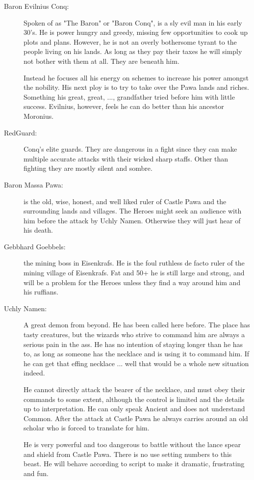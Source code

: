 \begin{description}
\item[Baron Evilnius Conq:] Spoken of as "The Baron" or "Baron Conq", is a sly evil man in his early 30's. He is power hungry and greedy, missing few opportunities to cook up plots and plans. However, he is not an overly bothersome tyrant to the people living on his lands. As long as they pay their taxes he will simply not bother with them at all. They are beneath him.

Instead he focuses all his energy on schemes to increase his power amongst the nobility. His next ploy is to try to take over the Pawa lands and riches. Something his great, great, ..., grandfather tried before him with little success. Evilnius, however, feels he can do better than his ancestor Moronius.


\item[RedGuard:] Conq's elite guards. They are dangerous in a fight since they can make multiple accurate attacks with their wicked sharp staffs. Other than fighting they are mostly silent and sombre.


\item[Baron Massa Pawa:] is the old, wise, honest, and well liked ruler of Castle Pawa and the surrounding lands and villages. The Heroes might seek an audience with him before the attack by Uchly Namen. Otherwise they will just hear of his death.


\item[Gebbhard Goebbels:] the mining boss in Eisenkrafs. He is the foul ruthless de facto ruler of the mining village of Eisenkrafs. Fat and 50+ he is still large and strong, and will be a problem for the Heroes unless they find a way around him and his ruffians.


\item[Uchly Namen:] A great demon from beyond. He has been called here before. The place has tasty creatures, but the wizards who strive to command him are always a serious pain in the ass. He has no intention of staying longer than he has to, as long as someone has the necklace and is using it to command him. If he can get that effing necklace ... well that would be a whole new situation indeed.

He cannot directly attack the bearer of the necklace, and must obey their commands to some extent, although the control is limited and the details up to interpretation. He can only speak Ancient and does not understand Common. After the attack at Castle Pawa he always carries around an old scholar who is forced to translate for him.

He is very powerful and too dangerous to battle without the lance spear and shield from Castle Pawa. There is no use setting numbers to this beast. He will behave according to script to make it dramatic, frustrating and fun.

\end{description}














